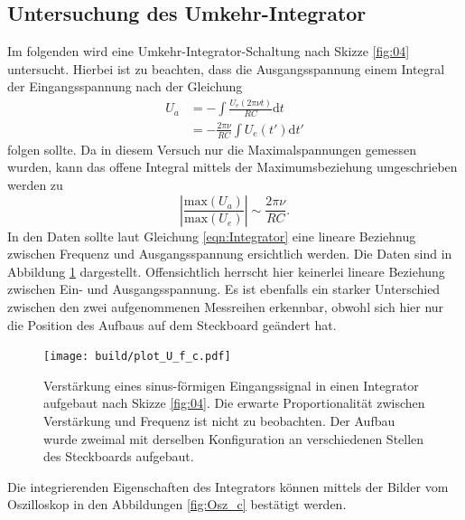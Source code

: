\subsection{Untersuchung des Umkehr-Integrator}
Im folgenden wird eine Umkehr-Integrator-Schaltung nach Skizze \ref{fig:04} untersucht. Hierbei ist zu beachten, dass die Ausgangsspannung einem Integral der Eingangsspannung nach der Gleichung
\begin{align}
  U_a &= -\int \frac{U_e(2\pi \nu t)}{RC}\text{d}t\\
      &= -\frac{2\pi\nu}{RC} \int U_e(t') \text{d}t'
\end{align}
folgen sollte. Da in diesem Versuch nur die Maximalspannungen gemessen wurden, kann das offene Integral mittels der Maximumsbeziehung umgeschrieben werden zu
\begin{equation}
  \left|\frac{\text{max}\left(U_a\right)}{\text{max}\left(U_e\right)}\right| \sim \frac{2\pi\nu}{RC}.
  \label{eqn:Integrator}
\end{equation}
In den Daten sollte laut Gleichung \ref{eqn:Integrator} eine lineare Beziehnug zwischen Frequenz und Ausgangsspannung ersichtlich werden. Die Daten sind in Abbildung \ref{fig:Plot_c} dargestellt. Offensichtlich herrscht hier keinerlei lineare Beziehung zwischen Ein- und Ausgangsspannung. Es ist ebenfalls ein starker Unterschied zwischen den zwei aufgenommenen Messreihen erkennbar, obwohl sich hier nur die Position des Aufbaus auf dem Steckboard geändert hat.
\FloatBarrier
\begin{figure}
  \centering
  \texttt{[image: build/plot\_U\_f\_c.pdf]}
  \caption{Verstärkung eines sinus-förmigen Eingangssignal in einen Integrator aufgebaut nach Skizze \ref{fig:04}. Die erwarte Proportionalität zwischen Verstärkung und Frequenz ist nicht zu beobachten. Der Aufbau wurde zweimal mit derselben Konfiguration an verschiedenen Stellen des Steckboards aufgebaut.}
  \label{fig:Plot_c}
\end{figure}
Die integrierenden Eigenschaften des Integrators können mittels der Bilder vom Oszilloskop in den Abbildungen \ref{fig:Osz_c} bestätigt werden.
\FloatBarrier
\FloatBarrier
